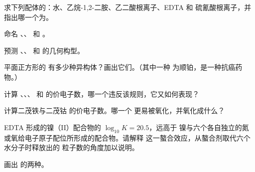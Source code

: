 \begin{exercise}[$\star$]\label{exo:b2:coordination-complexes:2}
求下列配体的：水、乙烷-1,2-二胺、乙二酸根离子、EDTA 和
硫氰酸根离子，并指出哪一个为。
\end{exercise}

\begin{exercise}[$\star$]\label{exo:b2:coordination-complexes:3}
命名 、、 和
\ce{[Ni(CO)4]}。
\end{exercise}

\begin{exercise}[$\star$]\label{exo:b2:coordination-complexes:4}
预测 \ce{[Ag(NH3)2]+}、、 和
 的几何构型。
\end{exercise}

\begin{exercise}[$\star\star$]\label{exo:b2:coordination-complexes:5}
平面正方形的 \ce{[PtCl2(NH3)2]} 有多少种异构体？画出它们。（其中一种
为顺铂，是一种抗癌药物。）
\end{exercise}

\begin{exercise}[$\star\star$]\label{exo:b2:coordination-complexes:6}
计算 、、、
 和  的价电子数，哪一个违反该规则，它又如何表现？
\end{exercise}

\begin{exercise}[$\star\star$]\label{exo:b2:coordination-complexes:7}
计算二茂铁与二茂钴  的价电子数。哪一个
更易被氧化，并氧化成什么？
\end{exercise}

\begin{exercise}[$\star\star$]\label{exo:b2:coordination-complexes:8}
EDTA 形成的镍（II）配合物的 $\log_{10}K = 20.5$，远高于
镍与六个各自独立的氮或氧给电子原子配位所形成的配合物。请解释
这一螯合效应，从螯合剂取代六个水分子时释放出的
粒子数的角度加以说明。
\end{exercise}

\begin{exercise}[$\star\star$]\label{exo:b2:coordination-complexes:9}
画出  的两种。
\end{exercise}

